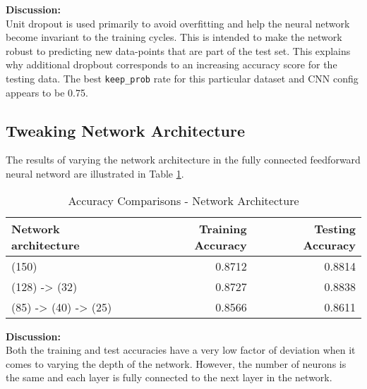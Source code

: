\documentclass[parskip=half]{scrartcl}
\begin{document}
        \textbf{Discussion:}\\
        Unit dropout is used primarily to avoid overfitting and help the neural network become invariant to the training cycles. This is intended to make the network robust to predicting new data-points that are part of the test set. This explains why additional dropbout corresponds to an increasing accuracy score for the testing data. The best \texttt{keep\_prob} rate for this particular dataset and CNN config appears to be 0.75.

    

    \subsection{Tweaking Network Architecture} %
    \label{sub:tweaking_network_architecture}

        The results of varying the network architecture in the fully connected feedforward neural netword are illustrated in Table \ref{tab:accuracy_comparisons_network_architecture}.

        \begin{table}[th]
            \centering
            \begin{tabular}{| l | r | r |}
            \hline
            \textbf{Network architecture} & \textbf{Training Accuracy} & \textbf{Testing Accuracy} \\
            \hline
                \hline
                (150) & 0.8712 & 0.8814 \\
                \hline
                (128) -> (32) & 0.8727 & 0.8838 \\
                \hline
                (85) -> (40) -> (25) & 0.8566 & 0.8611 \\
            \hline
            \end{tabular}
            \caption{Accuracy Comparisons - Network Architecture}
            \label{tab:accuracy_comparisons_network_architecture}
        \end{table}

        \textbf{Discussion:}\\
        Both the training and test accuracies have a very low factor of deviation when it comes to varying the depth of the network. However, the number of neurons is the same and each layer is fully connected to the next layer in the network.
    
    
\end{document}
